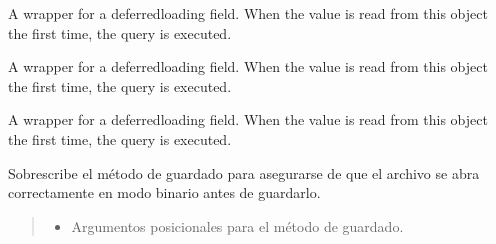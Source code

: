 \documentclass[letterpaper,10pt,spanish]{sphinxmanual}
\begin{document}
\begin{fulllineitems}
\begin{fulllineitems}
\pysigstartsignatures
{}
\pysigstopsignatures
\sphinxAtStartPar
A wrapper for a deferred\sphinxhyphen{}loading field. When the value is read from this
object the first time, the query is executed.

\end{fulllineitems}



\begin{fulllineitems}

\pysigstartsignatures
{}
\pysigstopsignatures
\sphinxAtStartPar
A wrapper for a deferred\sphinxhyphen{}loading field. When the value is read from this
object the first time, the query is executed.

\end{fulllineitems}



\begin{fulllineitems}

\pysigstartsignatures
{}
\pysigstopsignatures
\end{fulllineitems}



\begin{fulllineitems}

\pysigstartsignatures
{}
\pysigstopsignatures
\sphinxAtStartPar
A wrapper for a deferred\sphinxhyphen{}loading field. When the value is read from this
object the first time, the query is executed.

\end{fulllineitems}



\begin{fulllineitems}

\pysigstartsignatures
{}
\pysigstopsignatures
\sphinxAtStartPar
Sobrescribe el método de guardado para asegurarse de que el archivo se
abra correctamente en modo binario antes de guardarlo.
\begin{quote}\begin{description}
\begin{itemize}
\item {} 
\sphinxAtStartPar
{} \textendash{} Argumentos posicionales para el método de guardado.


\end{itemize}
\end{description}
\end{quote}
\end{fulllineitems}
\end{fulllineitems}
\end{document}

